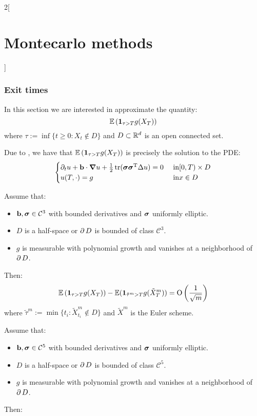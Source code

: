 \documentclass[../../../main_math.tex]{subfiles}
\begin{document}
\begin{multicols}{2}[\section{Montecarlo methods}]
  \subsubsection{Exit times}
  In this section we are interested in approximate the quantity:
  $$
    \mathbb{E}\left(\boldsymbol{\mathrm{1}}_{\tau>T}g(X_T) \right)
  $$
  where $\tau:=\inf\{ t\geq 0 : X_t\notin D\}$ and $D\subset \mathbb{R}^d$ is an open connected set.
  \begin{remark}
    Due to , we have that $\mathbb{E}\left(\boldsymbol{\mathrm{1}}_{\tau>T}g(X_T) \right)$ is precisely the solution to the PDE:
    $$
      \begin{cases}
        \partial_t u+\vf{b}\cdot \grad u+\frac{1}{2}\trace(\vf{\sigma}\transpose{\vf{\sigma}}\laplacian u)=0 & \text{ in} [0,T)\times D \\
        u(T,\cdot)=g                                                                                         & \text{ in}x\in D
      \end{cases}
    $$
  \end{remark}
  \begin{proposition}
    Assume that:
    \begin{itemize}
      \item $\boldsymbol{\mathrm{b}},\boldsymbol{\mathrm{\sigma}}\in\mathcal{C}^3$ with bounded derivatives and $\boldsymbol{\mathrm{\sigma}}$ uniformly elliptic.
      \item $D$ is a half-space or $\operatorname{\partial}{D}$ is bounded of class $\mathcal{C}^3$.
      \item $g$ is measurable with polynomial growth and vanishes at a neighborhood of $\operatorname{\partial}{D}$.
    \end{itemize}
    Then:
    $$
      \mathbb{E}\left(\boldsymbol{\mathrm{1}}_{\tau>T}g(X_T) \right)-\mathbb{E}(\boldsymbol{\mathrm{1}}_{\tilde\tau^m>T} g(\tilde{X}^m_T))=\mathrm{O}\left(\frac{1}{\sqrt{m}}\right)
    $$
    where $\tilde\tau^m:=\min\{ t_i: \tilde{X}^m_{t_i}\notin D\}$ and $\tilde{X}^m$ is the Euler scheme.
  \end{proposition}
  \begin{proposition}
    Assume that:
    \begin{itemize}
      \item $\boldsymbol{\mathrm{b}},\boldsymbol{\mathrm{\sigma}}\in\mathcal{C}^5$ with bounded derivatives and $\boldsymbol{\mathrm{\sigma}}$ uniformly elliptic.
      \item $D$ is a half-space or $\operatorname{\partial}{D}$ is bounded of class $\mathcal{C}^5$.
      \item $g$ is measurable with polynomial growth and vanishes at a neighborhood of $\operatorname{\partial}{D}$.
    \end{itemize}
    Then:
    $$
$$
\end{proposition}
\end{multicols}
\end{document}
